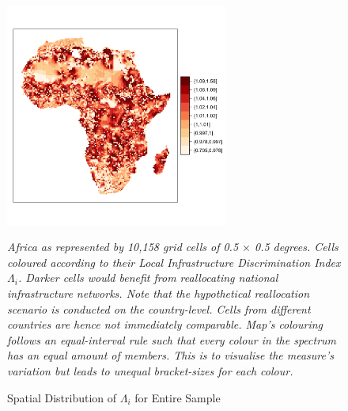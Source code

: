 \documentclass[11pt, oneside]{article}   	%
\newcommand{\mysubcaption}[1]{
\justify
\begin{spacing}{0.7}
\textit{\footnotesize #1}
\end{spacing}}
\begin{document}
\begin{figure}
\centering
\caption{Spatial Distribution of $\Lambda_{i}$ for Entire Sample}
\includegraphics[width=0.65\textwidth,trim={1cm 4cm 1cm 5cm},clip]{../../Analysis/output/zeta_heatmaps/African_gridcells_zeta.png}

\label{fig:all_gridcells_by_zeta}
\mysubcaption{Africa as represented by 10,158 grid cells of 0.5 $\times$ 0.5 degrees. Cells coloured according to their Local Infrastructure Discrimination Index $\Lambda_{i}$. Darker cells would benefit from reallocating national infrastructure networks. Note that the hypothetical reallocation scenario is conducted on the country-level. Cells from different countries are hence not immediately comparable. Map's colouring follows an equal-interval rule such that every colour in the spectrum has an equal amount of members. This is to visualise the measure's variation but leads to unequal bracket-sizes for each colour.}
\end{figure}
\end{document}

